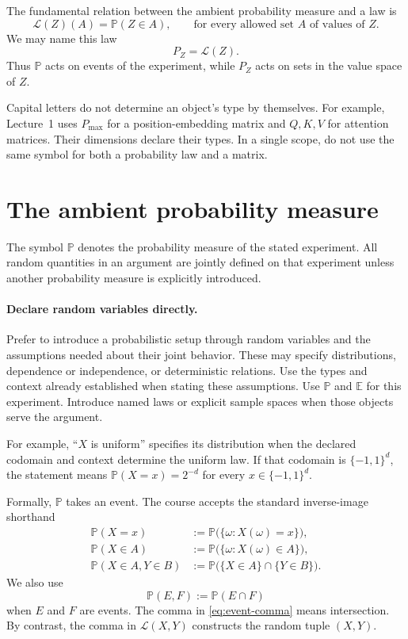 \documentclass[11pt]{article}
\newcommand{\E}{\mathbb E}
\renewcommand{\P}{\mathbb P}
\newcommand{\Law}{\mathcal L}
\begin{document}
The fundamental relation between the ambient probability measure and a law is
\begin{equation}
 \Law(Z)(A)=\P(Z\in A),
 \qquad \text{for every allowed set }A\text{ of values of }Z.
 \label{eq:law}
\end{equation}
We may name this law
\[
 P_Z=\Law(Z).
\]
Thus \(\P\) acts on events of the experiment, while \(P_Z\) acts on sets in
the value space of \(Z\).

Capital letters do not determine an object's type by themselves. For example,
Lecture~1 uses \(P_{\max}\) for a position-embedding matrix and
\(Q,K,V\) for attention matrices. Their dimensions declare their types. In a
single scope, do not use the same symbol for both a probability law and a
matrix.

\section{The ambient probability measure}

The symbol \(\P\) denotes the probability measure of the stated experiment.
All random quantities in an argument are jointly defined on that experiment
unless another probability measure is explicitly introduced.

\paragraph{Declare random variables directly.}
Prefer to introduce a probabilistic setup through random variables and the
assumptions needed about their joint behavior. These may specify
distributions, dependence or independence, or deterministic relations.
Use the types and context already established when stating these
assumptions. Use \(\P\) and \(\E\) for this experiment. Introduce named
laws or explicit sample spaces when those objects serve the argument.

For example, ``\(X\) is uniform'' specifies its distribution when the
declared codomain and context determine the uniform law. If that codomain
is \(\{-1,1\}^d\), the statement means \(\P(X=x)=2^{-d}\) for every
\(x\in\{-1,1\}^d\).

Formally, \(\P\) takes an event. The course accepts the standard inverse-image
shorthand
\begin{align}
 \P(X=x)
 &:=\P\bigl(\{\omega:X(\omega)=x\}\bigr),
 \label{eq:event-equality}\\
 \P(X\in A)
 &:=\P\bigl(\{\omega:X(\omega)\in A\}\bigr),
 \label{eq:event-membership}\\
 \P(X\in A,Y\in B)
 &:=\P\bigl(\{X\in A\}\cap\{Y\in B\}\bigr).
 \label{eq:event-joint}
\end{align}
We also use
\begin{equation}
 \P(E,F):=\P(E\cap F)
 \label{eq:event-comma}
\end{equation}
when \(E\) and \(F\) are events. The comma in \cref{eq:event-comma}
means intersection. By contrast, the comma in \(\Law(X,Y)\) constructs the
random tuple \((X,Y)\).
\end{document}
